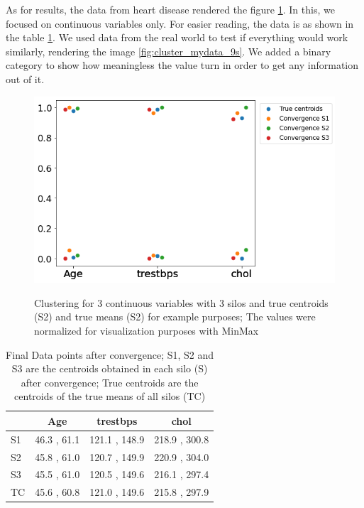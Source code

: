 As for results, the data from heart disease rendered the figure \ref{fig:cluster_free_3s}. In this, we focused on continuous variables only. For easier reading, the data is as shown in the table \ref{tab:datapoints}. We used data from the real world to test if everything would work similarly, rendering the image \ref{fig:cluster_mydata_9s}. We added a binary category to show how meaningless the value turn in order to get any information out of it.





\begin{figure}[htpb]
\centering
\captionsetup{justification=centering}
\caption[Clustering for 3 continuous variables with 3 silos]{Clustering for 3 continuous variables with 3 silos and true centroids (S2) and true means (S2) for example purposes; The values were normalized for visualization purposes with MinMax}
\includegraphics[scale=0.50]{figures/my_cluster_3.png}
\label{fig:cluster_free_3s} 
\end{figure}



\begin{table}[htbp]
\centering
 \setlength{\tabcolsep}{7pt} %
 \renewcommand{\arraystretch}{1.35} %
  \captionsetup{justification=centering} 
\caption[Final Data points after convergence of clustering]{Final Data points after convergence; S1, S2 and S3 are the centroids obtained in each silo (S) after convergence; True centroids are the centroids of the true means of all silos (TC)}
\label{tab:datapoints}
\begin{tabular}{l|ccc}
\toprule
 & Age & trestbps & chol \\
\midrule
S1 & 46.3 , 61.1 & 121.1 , 148.9 & 218.9 , 300.8 \\
S2  & 45.8 , 61.0 & 120.7 , 149.9 & 220.9 , 304.0 \\
S3 & 45.5 , 61.0 & 120.5 , 149.6 & 216.1 , 297.4 \\
TC  & 45.6 , 60.8 & 121.0 , 149.6 & 215.8 , 297.9   \\

\bottomrule
\end{tabular}
\end{table}




